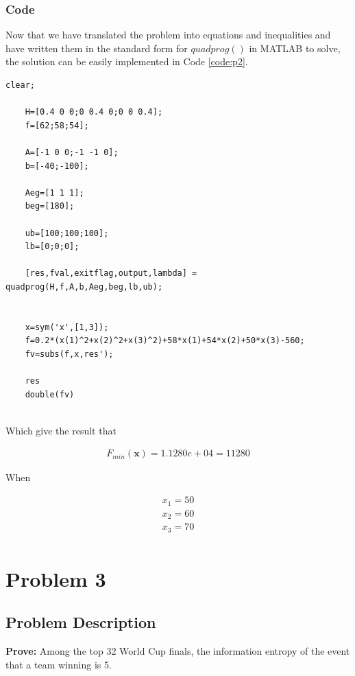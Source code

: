 \documentclass[12pt]{article}
\begin{document}
\subsubsection{Code}

Now that we have translated the problem into equations and inequalities and have written them in the standard form for $quadprog()$ in MATLAB to solve, the solution can be easily implemented in Code \ref{code:p2}.

\begin{lstlisting}[style=MatlabStyle,caption=Solve using $quadprog()$,label=code:p2]
	clear;
	
	H=[0.4 0 0;0 0.4 0;0 0 0.4];
	f=[62;58;54];
	
	A=[-1 0 0;-1 -1 0];
	b=[-40;-100];
	
	Aeg=[1 1 1];
	beg=[180];
	
	ub=[100;100;100];
	lb=[0;0;0];
	
	[res,fval,exitflag,output,lambda] = quadprog(H,f,A,b,Aeg,beg,lb,ub);
	
	
	x=sym('x',[1,3]);
	f=0.2*(x(1)^2+x(2)^2+x(3)^2)+58*x(1)+54*x(2)+50*x(3)-560;
	fv=subs(f,x,res');
	
	res
	double(fv)
	
\end{lstlisting}

Which give the result that

\begin{equation}
	\begin{aligned}
		F_{min}(\mathbf{x})=1.1280e+04=11280
	\end{aligned}
\end{equation}

When

\begin{equation}
	\begin{aligned}
		x_1 = 50 \\
		x_2 = 60 \\
		x_3 = 70 \\
	\end{aligned}
\end{equation}

\section{Problem 3}

\subsection{Problem Description}
\textbf{Prove:} Among the top 32 World Cup finals, the information entropy of the event that a team winning is 5.
\end{document}
